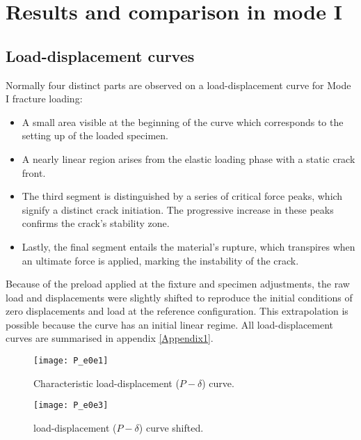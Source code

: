 \section{Results and comparison in mode I}

\subsection{Load-displacement curves}

Normally four distinct parts are observed on a load-displacement curve for Mode I fracture loading:

\begin{itemize}
	\item A small area visible at the beginning of the curve which corresponds to the setting up of the loaded specimen. 
	\item A nearly linear region arises from the elastic loading phase with a static crack front.
	\item The third segment is distinguished by a series of critical force peaks, which signify a distinct crack initiation. The progressive increase in these peaks confirms the crack's stability zone.
	\item Lastly, the final segment entails the material's rupture, which transpires when an ultimate force is applied, marking the instability of the crack.
\end{itemize}

Because of the preload applied at the fixture and specimen adjustments, the raw load and displacements were slightly shifted to reproduce the initial conditions of zero displacements and load at the reference configuration. This extrapolation is possible because the curve has an initial linear regime. All load-displacement curves are summarised in appendix \ref{Appendix1}.


\begin{figure}[htp]
	\begin{minipage}[c]{.46\linewidth}
		\centering
		\texttt{[image: P\_e0e1]}
		\caption{Characteristic load-displacement ($P-\delta$) curve.}
		\label{fig:e0e1_Pdelta}
	\end{minipage}
	\hfill%
	\begin{minipage}[c]{.46\linewidth}
		\centering
		\texttt{[image: P\_e0e3]}
		\caption{load-displacement ($P-\delta$) curve shifted.}
		\label{fig:e0e5_Pdelta}
	\end{minipage}
\end{figure}


